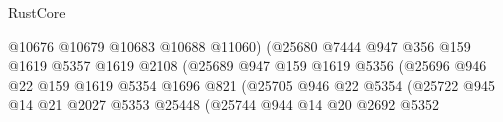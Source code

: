 \begin{lexlean}{RustCore}
\begin{coremodule}
                                                  @10676
                                                  @10679
                                                  @10683
                                                  @10688
                                                  @11060)
                                                (@25680
                                                  @7444
                                                  @947
                                                  @356
                                                  @159
                                                  @1619
                                                  @5357
                                                  @1619
                                                  @2108
                                                  (@25689
                                                    @947
                                                    @159
                                                    @1619
                                                    @5356
                                                    (@25696
                                                      @946
                                                      @22
                                                      @159
                                                      @1619
                                                      @5354
                                                      @1696
                                                      @821
                                                      (@25705
                                                        @946
                                                        @22
                                                        @5354
                                                        (@25722
                                                          @945
                                                          @14
                                                          @21
                                                          @2027
                                                          @5353
                                                          @25448
                                                          (@25744
                                                            @944
                                                            @14
                                                            @20
                                                            @2692
                                                            @5352

\end{coremodule}
\end{lexlean}
